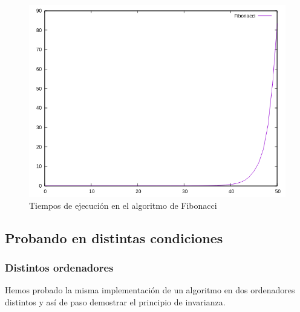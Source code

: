 \documentclass{article}
\begin{document}
\begin{figure}[H]
	\centering
	\includegraphics[totalheight=8cm]{img/fibonacci}
	\caption{Tiempos de ejecución en el algoritmo de Fibonacci}
	\label{fig:fibonacci}
\end{figure}

\subsection{Probando en distintas condiciones}
\subsubsection{Distintos ordenadores}
Hemos probado la misma implementación de un algoritmo en dos ordenadores distintos y así de paso demostrar el principio de invarianza.
\
\end{document}

